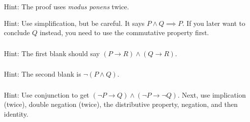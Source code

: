 \subsubsection*{ \answers}
\begin{apart}
    \item Hint: The proof uses \emph{modus ponens} twice.
    \item Hint: Use simplification, but be careful.  It says $P \land Q \implies P$.  If you later want to conclude $Q$ instead, you need to use the commutative property first.
\end{apart}

\subsubsection*{ \answers}
Hint: The first blank should say $(P \to R) \land (Q \to R)$.

\subsubsection*{ \answers}
Hint: The second blank is $\neg(P \land Q)$.

\subsubsection*{ \answers}
Hint: Use conjunction to get $(\neg P \to Q) \land (\neg P \to \neg Q)$. Next, use implication (twice), double negation (twice), the distributive property, negation, and then identity.







